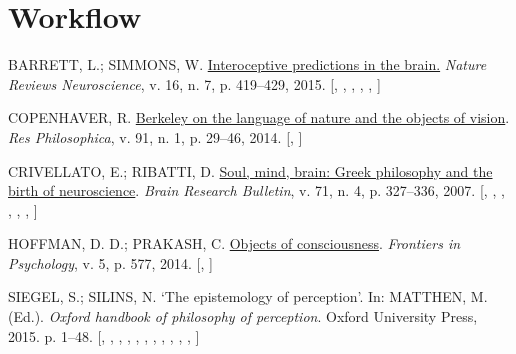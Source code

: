 \documentclass[
  12pt,
  a4paper,
  oneside,
  titlepage,
  toclink=all,
  toc=bibliography]{scrbook}
\newlength{\cslhangindent}
\newlength{\cslentryspacingunit} %
\newenvironment{CSLReferences}[2] %
 {%
  \setlength{\parindent}{0pt}
  \ifodd #1
  \let\oldpar\par
  \def\par{\hangindent=\cslhangindent\oldpar}
  \fi
  \setlength{\parskip}{#2\cslentryspacingunit}
 }%
 {}
\theoremstyle{definition}
\theoremstyle{definition}
\theoremstyle{plain}
\theoremstyle{definition}
\theoremstyle{plain}
\theoremstyle{plain}
\theoremstyle{plain}
\theoremstyle{plain}
\theoremstyle{remark}
\begin{document}
\hypertarget{sec-scriv212}{%
\chapter{Workflow}\label{sec-scriv212}}

\hypertarget{refs_scriv212}{}
\begin{CSLReferences}{0}{1}
\leavevmode{}%
BARRETT, L.; SIMMONS, W.
\href{https://doi.org/10.1038/nrn3950}{Interoceptive predictions in the
brain.} \emph{Nature Reviews Neuroscience}, v. 16, n. 7, p. 419--429,
2015. {[},
\protect\hyperlink{cite_2}{\pageref{cite_2}},
\protect\hyperlink{cite_7}{\pageref{cite_7}},
\protect\hyperlink{cite_8}{\pageref{cite_8}},
\protect\hyperlink{cite_9}{\pageref{cite_9}},
\protect\hyperlink{cite_38}{\pageref{cite_38}}{]}

\leavevmode{}%
COPENHAVER, R. \href{}{Berkeley on the language of nature and the
objects of vision}. \emph{Res Philosophica}, v. 91, n. 1, p. 29--46,
2014. {[},
\protect\hyperlink{cite_7}{\pageref{cite_7}}{]}

\leavevmode{}%
CRIVELLATO, E.; RIBATTI, D.
\href{https://doi.org/10.1016/j.brainresbull.2006.09.020}{Soul, mind,
brain: Greek philosophy and the birth of neuroscience}. \emph{Brain
Research Bulletin}, v. 71, n. 4, p. 327--336, 2007.
{[},
\protect\hyperlink{cite_1}{\pageref{cite_1}},
\protect\hyperlink{cite_2}{\pageref{cite_2}},
\protect\hyperlink{cite_5}{\pageref{cite_5}},
\protect\hyperlink{cite_9}{\pageref{cite_9}},
\protect\hyperlink{cite_28}{\pageref{cite_28}},
\protect\hyperlink{cite_38}{\pageref{cite_38}}{]}

\leavevmode{}%
HOFFMAN, D. D.; PRAKASH, C.
\href{https://doi.org/10.3389/fpsyg.2014.00577}{Objects of
consciousness}. \emph{Frontiers in Psychology}, v. 5, p. 577, 2014.
{[},
\protect\hyperlink{cite_7}{\pageref{cite_7}}{]}

\leavevmode{}%
SIEGEL, S.; SILINS, N. {`The epistemology of perception'}. In: MATTHEN,
M. (Ed.). \emph{Oxford handbook of philosophy of perception}. Oxford
University Press, 2015. p. 1--48.
{[},
\protect\hyperlink{cite_7}{\pageref{cite_7}},
\protect\hyperlink{cite_14}{\pageref{cite_14}},
\protect\hyperlink{cite_15}{\pageref{cite_15}},
\protect\hyperlink{cite_19}{\pageref{cite_19}},
\protect\hyperlink{cite_23}{\pageref{cite_23}},
\protect\hyperlink{cite_29}{\pageref{cite_29}},
\protect\hyperlink{cite_34}{\pageref{cite_34}},
\protect\hyperlink{cite_35}{\pageref{cite_35}},
\protect\hyperlink{cite_36}{\pageref{cite_36}},
\protect\hyperlink{cite_37}{\pageref{cite_37}},
\protect\hyperlink{cite_38}{\pageref{cite_38}}{]}


\end{CSLReferences}
\end{document}
